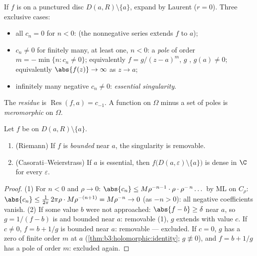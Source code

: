 \begin{definition}\label{def:b3:residues:singularities}
If $f$ is  on a punctured disc $D(a, R)\setminus
\{a\}$, expand by Laurent ($r = 0$). Three exclusive
cases:
\begin{itemize}
  \item all $c_n = 0$ for $n < 0$: \emph{} (the nonnegative series extends $f$
         to $a$);
  \item $c_n \neq 0$ for finitely many, at least one, $n < 0$:
        a \emph{pole} of order $m = -\min\{n : c_n \neq 0\}$;
        equivalently $f = g/(z-a)^m$, $g$ , $g(a)
        \neq 0$; equivalently $\abs{f(z)} \to \infty$ as $z\to
        a$;
  \item infinitely many negative $c_n \neq 0$:
        \emph{essential singularity}.
\end{itemize}
The \emph{residue} is
$\operatorname{Res}(f, a) = c_{-1}$. A function  on
$\Omega$ minus a set of poles is
\emph{meromorphic} on $\Omega$.
\end{definition}

\begin{theorem}
\label{thm:b3:residues:riemanncw}
Let $f$ be  on $D(a,R)\setminus\{a\}$.
\begin{enumerate}
  \item (Riemann) If $f$ is \emph{bounded} near $a$, the
        singularity is removable.
  \item (Casorati--Weierstrass) If $a$ is essential, then
        $f\bigl(D(a,\varepsilon)\setminus\{a\}\bigr)$ is dense
        in $\C$ for every $\varepsilon$.
\end{enumerate}
\end{theorem}

\begin{proof}
(1) For $n < 0$ and $\rho \to 0$: $\abs{c_n} \leq
M\rho^{-n-1}\cdot\rho\cdot\rho^{-\,n}\dots$ by ML on
$C_\rho$: $\abs{c_n} \leq \frac{1}{2\pi}\,2\pi\rho\cdot
M\rho^{-(n+1)} = M\rho^{-n} \to 0$ (as $-n > 0$): all
negative coefficients vanish.
(2) If some value $b$ were not approached: $\abs{f - b} \geq
\delta$ near $a$, so $g = 1/(f - b)$ is  and
bounded near $a$: removable (1), $g$ extends with value $c$.
If $c \neq 0$, $f = b + 1/g$ is bounded near $a$: removable
--- excluded. If $c = 0$, $g$ has a zero of finite order $m$
at $a$ (\cref{thm:b3:holomorphic:identity}; $g \not\equiv 0$),
and $f = b + 1/g$ has a pole of order $m$: excluded again.
\end{proof}

